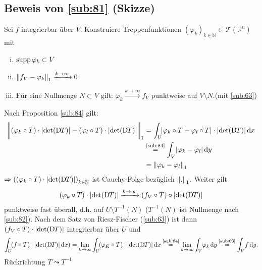 \subsection*{Beweis von \ref{sub:81} (Skizze)} %
Sei $f$ integrierbar über $V$. Konstruiere Treppenfunktionen $(\varphi_k)_{k \in \mathds{N}} \subset \mathcal{T}(\mathds{R}^n)$ mit
\begin{enumerate}[(i)]
	\item $\supp \varphi_k  \subset V$
	\item $\norm[1]{f_V- \varphi_k} \xrightarrow{k \to \infty} 0$
	\item Für eine Nullmenge $N \subset V$ gilt: $\varphi_k \xrightarrow{k \to \infty} f_V$ punktweise auf $V \setminus N$.\hfill(mit \ref{sub:63})
\end{enumerate}
Nach Proposition \ref{sub:84} gilt:
\begin{align*}
	\norm[1]{(\varphi_k \circ T) \cdot \abs*{\det(\D T)} - (\varphi_l \circ T) \cdot \abs*{\det(\D T)}\rule{0cm}{0.45cm} } &= \int_U \! \abs*{\varphi_k \circ T- \varphi_l \circ T} \cdot 
	\abs*{\det(\D T)}  \, \mathrm{d}x \\
	&\stackrel{\text{\ref{sub:84}}}{=} \int_V \abs*{\varphi_k - \varphi_l}  \, \mathrm{d}y  \\
	&= \norm[1]{\varphi_k - \varphi_l} 
\end{align*}
$\Rightarrow \enbrace*{ (\varphi_k \circ T) \cdot \abs*{\det (\D T)} }_{k \in \mathds{N}} $ ist Cauchy-Folge bezüglich $\norm[1]{.} $. Weiter gilt 
\begin{align*}
	(\varphi_k \circ T) \cdot \abs*{ \det (\D T)} \xrightarrow{k \to \infty} (f_V \circ T) \circ \abs*{\det(\D T)} 
\end{align*}
punktweise fast überall, d.h. auf $U \setminus T^{-1}(N)$ ($T ^{-1}(N)$ ist Nullmenge nach \ref{sub:82}). Nach dem Satz von Riesz-Fischer (\ref{sub:63}) ist dann
$(f_V \circ T) \cdot \abs*{\det (\D T)} $ integrierbar über $U$ und 
\[
	\int_U \!(f \circ T) \cdot \abs*{ \det (\D T)}  \, \mathrm{d}x ) = \lim_{ k \to \infty} \int_U \! (\varphi_K \circ T) \cdot \abs*{\det (\D T)}  \, \mathrm{d}x   
	\stackrel{\text{\ref{sub:84}}}{=} \lim_{ k \to \infty} \int_V \! \varphi_k  \, \mathrm{d}y \stackrel{\text{\ref{sub:63}}}{=} \int_V \! f  \, \mathrm{d}y.
\]
Rückrichtung $T \leadsto T ^{-1}$ \bewende

